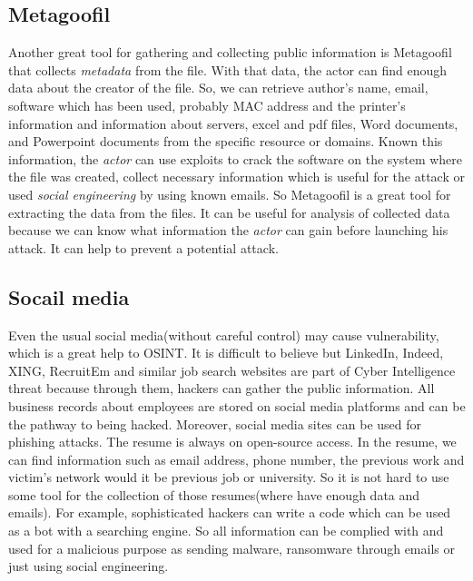 \documentclass[12pt, letterpaper, twoside]{article}
\begin{document}
\subsection{Metagoofil}
Another great tool for gathering and collecting public information is Metagoofil that collects \textit{metadata} from the file. With that data, the actor can find enough data about the creator of the file. So, we can retrieve author's name, email, software which has been used, probably MAC address and the printer's information and information about servers, excel and pdf files, Word documents, and Powerpoint documents from the specific resource or domains\cite{SentinelOne}. Known this information, the \textit{actor} can use exploits to crack the software on the system where the file was created, collect necessary information which is useful for the attack or used \textit{social engineering} by using known emails\cite{DNSstuff}. 
So Metagoofil is a great tool for extracting the data from the files. It can be useful for analysis of collected data because we can know what information the \textit{actor} can gain before launching his attack. It can help to prevent a potential attack.

\newpage

\subsection{Socail media}
Even the usual social media(without careful control) may cause vulnerability, which is a great help to OSINT. It is difficult to believe but LinkedIn, Indeed, XING, RecruitEm and similar job search websites are part of Cyber Intelligence threat because through them, hackers can gather the public information. All business records about employees are stored on social media platforms and can be the pathway to being hacked. Moreover, social media sites can be used for phishing attacks. The resume is always on open-source access. In the resume, we can find information such as email address, phone number, the previous work and victim's network would it be previous job or university. So it is not hard to use some tool for the collection of those resumes(where have enough data and emails). For example, sophisticated hackers can write a code which can be used as a bot with a searching engine. So all information can be complied with and used for a malicious purpose as sending malware, ransomware through emails or just using social engineering.  
 
\newpage 
\end{document}
